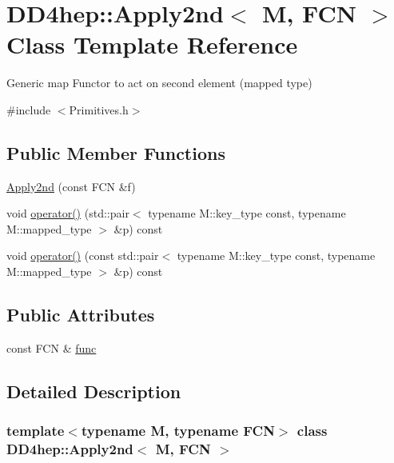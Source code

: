 \hypertarget{class_d_d4hep_1_1_apply2nd}{}\section{D\+D4hep\+:\+:Apply2nd$<$ M, F\+CN $>$ Class Template Reference}
\label{class_d_d4hep_1_1_apply2nd}


Generic map Functor to act on second element (mapped type)  




{\ttfamily \#include $<$Primitives.\+h$>$}

\subsection*{Public Member Functions}
\begin{DoxyCompactItemize}
\item 
\hyperlink{class_d_d4hep_1_1_apply2nd_a89cea532d07e73253a2dcb37587d3fd7}{Apply2nd} (const F\+CN \&f)
\item 
void \hyperlink{class_d_d4hep_1_1_apply2nd_a8099f6ac9d6df8cc8925d35a212b05a8}{operator()} (std\+::pair$<$ typename M\+::key\+\_\+type const, typename M\+::mapped\+\_\+type $>$ \&p) const
\item 
void \hyperlink{class_d_d4hep_1_1_apply2nd_ae08b4b0fb373ff5f933381219fe29902}{operator()} (const std\+::pair$<$ typename M\+::key\+\_\+type const, typename M\+::mapped\+\_\+type $>$ \&p) const
\end{DoxyCompactItemize}
\subsection*{Public Attributes}
\begin{DoxyCompactItemize}
\item 
const F\+CN \& \hyperlink{class_d_d4hep_1_1_apply2nd_aa83e5fb456b913dfe4801fb585b073e0}{func}
\end{DoxyCompactItemize}


\subsection{Detailed Description}
\subsubsection*{template$<$typename M, typename F\+CN$>$\newline
class D\+D4hep\+::\+Apply2nd$<$ M, F\+C\+N $>$}

